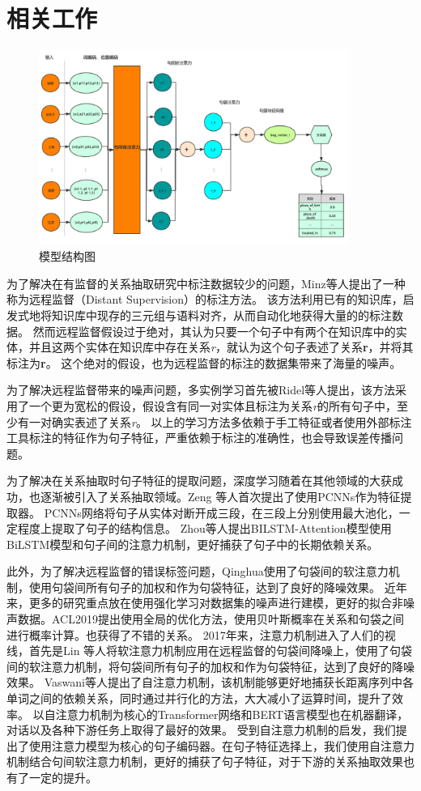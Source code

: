 \documentclass[UTF8]{csoarticle}
\begin{document}
\section{相关工作}
\begin{figure}[ht]
\centering
\includegraphics[width=0.9\textwidth]{structure.png} 
\caption{模型结构图}
\label{fig:fig1}
\end{figure}
为了解决在有监督的关系抽取研究中标注数据较少的问题，Minz\cite{bib1}等人提出了一种称为远程监督（Distant Supervision）的标注方法。
该方法利用已有的知识库，启发式地将知识库中现存的三元组与语料对齐，从而自动化地获得大量的的标注数据。
然而远程监督假设过于绝对，其认为只要一个句子中有两个在知识库中的实体，并且这两个实体在知识库中存在关系\textit{r}，就认为这个句子表述了关系\textbf{r}，并将其标注为\textbf{r}。
这个绝对的假设，也为远程监督的标注的数据集带来了海量的噪声。

为了解决远程监督带来的噪声问题，多实例学习首先被Ridel\cite{bib2}等人提出，该方法采用了一个更为宽松的假设，假设含有同一对实体且标注为关系\textit{r}的所有句子中，至少有一对确实表述了关系\textit{r}。
以上的学习方法多依赖于手工特征或者使用外部标注工具标注的特征作为句子特征，严重依赖于标注的准确性，也会导致误差传播问题。

为了解决在关系抽取时句子特征的提取问题，深度学习随着在其他领域的大获成功，也逐渐被引入了关系抽取领域。Zeng\cite{bib3} 等人首次提出了使用PCNNs作为特征提取器。
PCNNs网络将句子从实体对断开成三段，在三段上分别使用最大池化，一定程度上提取了句子的结构信息。
Zhou\cite{bib7}等人提出BILSTM-Attention模型使用BiLSTM模型和句子间的注意力机制，更好捕获了句子中的长期依赖关系。

此外，为了解决远程监督的错误标签问题，Qinghua使用了句袋间的软注意力机制，使用句袋间所有句子的加权和作为句袋特征，达到了良好的降噪效果。
近年来，更多的研究重点放在使用强化学习对数据集的噪声进行建模，更好的拟合非噪声数据。ACL2019提出使用全局的优化方法，使用贝叶斯概率在关系和句袋之间进行概率计算。也获得了不错的关系。
2017年来，注意力机制进入了人们的视线，首先是Lin \cite{bib4}等人将软注意力机制应用在远程监督的句袋间降噪上，使用了句袋间的软注意力机制，将句袋间所有句子的加权和作为句袋特征，达到了良好的降噪效果。
Vaswani\cite{bib5}等人提出了自注意力机制，该机制能够更好地捕获长距离序列中各单词之间的依赖关系，同时通过并行化的方法，大大减小了运算时间，提升了效率。
以自注意力机制为核心的Transformer网络和BERT语言模型也在机器翻译，对话以及各种下游任务上取得了最好的效果。
受到自注意力机制的启发，我们提出了使用注意力模型为核心的句子编码器。在句子特征选择上，我们使用自注意力机制结合句间软注意力机制，更好的捕获了句子特征，对于下游的关系抽取效果也有了一定的提升。
\end{document}

